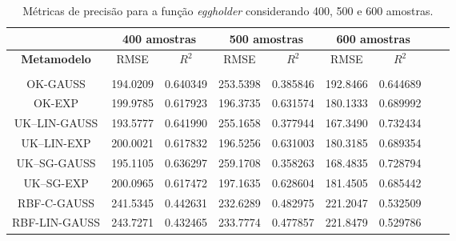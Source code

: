 \begin{table}[H]
	\centering
	\caption{Métricas de precisão para a função \textit{eggholder} considerando 400, 500 e 600 amostras.} \label{tab:8} 
	\begin{tabular}{c c c c c c c c c}
		\toprule
		& \multicolumn{2}{c}{\bf 400 amostras} & \multicolumn{2}{c}{\bf 500 amostras} & \multicolumn{2}{c}{\bf 600 amostras} \\ \midrule
		{\bf Metamodelo} & RMSE & {\bf $R^{2}$} & RMSE & {\bf $R^{2}$} & RMSE & {\bf $R^{2}$} \\
		\hline \\[2pt] 
		{OK-GAUSS} & 194.0209 & 0.640349 & 253.5398 & 0.385846 & 192.8466 & 0.644689  \\[4pt]
		OK-EXP & 199.9785 & 0.617923 & 196.3735	& 0.631574 & 180.1333 &	0.689992    \\[4pt]                 
		UK–LIN-GAUSS & 193.5777 & 0.641990 & 255.1658 & 0.377944 & 167.3490	& 0.732434    \\[4pt]
		UK–LIN-EXP & 200.0021 &	0.617832 & 196.5256 & 0.631003 & 180.3185 &	0.689354     \\[4pt]
		UK–SG-GAUSS & 195.1105 & 0.636297 & 259.1708 & 0.358263 & 168.4835 &	0.728794   \\[4pt]
		UK–SG-EXP & 200.0965 & 0.617472 & 197.1635 & 0.628604 & 181.4505 &	0.685442    \\[4pt]
		RBF-C-GAUSS & 241.5345 & 0.442631 & 232.6289 &	0.482975 & 221.2047 &	0.532509   \\[4pt]
		RBF-LIN-GAUSS & 243.7271 & 0.432465 & 233.7774 & 0.477857 & 221.8479 &	0.529786   \\[4pt] \bottomrule
		
	\end{tabular}
	
\end{table}

